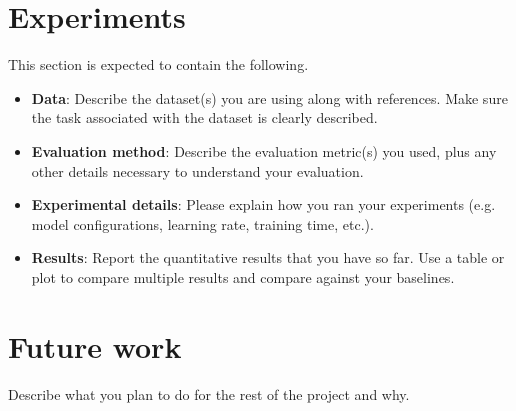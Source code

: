 \documentclass{article}
\begin{document}
\section{Experiments}
This section is expected to contain the following.
\begin{itemize}
    \item \textbf{Data}: Describe the dataset(s) you are using along with references. Make sure the task associated with the dataset is clearly described.
    \item \textbf{Evaluation method}: Describe the evaluation metric(s) you used, plus any other details necessary to understand your evaluation.
    \item \textbf{Experimental details}: Please explain how you ran your experiments (e.g. model configurations, learning rate, training time, etc.).
    \item \textbf{Results}: Report the quantitative results that you have so far. Use a table or plot to compare multiple results and compare against your baselines.
\end{itemize}


\section{Future work}
Describe what you plan to do for the rest of the project and why.




\end{document}

